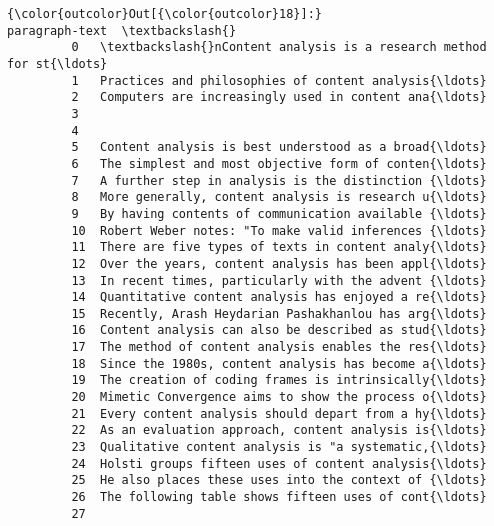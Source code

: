 \documentclass[11pt]{article}
\begin{document}
\begin{Verbatim}[commandchars=\\\{\}]
{\color{outcolor}Out[{\color{outcolor}18}]:}                                        paragraph-text  \textbackslash{}
         0   \textbackslash{}nContent analysis is a research method for st{\ldots}   
         1   Practices and philosophies of content analysis{\ldots}   
         2   Computers are increasingly used in content ana{\ldots}   
         3                                                       
         4                                                       
         5   Content analysis is best understood as a broad{\ldots}   
         6   The simplest and most objective form of conten{\ldots}   
         7   A further step in analysis is the distinction {\ldots}   
         8   More generally, content analysis is research u{\ldots}   
         9   By having contents of communication available {\ldots}   
         10  Robert Weber notes: "To make valid inferences {\ldots}   
         11  There are five types of texts in content analy{\ldots}   
         12  Over the years, content analysis has been appl{\ldots}   
         13  In recent times, particularly with the advent {\ldots}   
         14  Quantitative content analysis has enjoyed a re{\ldots}   
         15  Recently, Arash Heydarian Pashakhanlou has arg{\ldots}   
         16  Content analysis can also be described as stud{\ldots}   
         17  The method of content analysis enables the res{\ldots}   
         18  Since the 1980s, content analysis has become a{\ldots}   
         19  The creation of coding frames is intrinsically{\ldots}   
         20  Mimetic Convergence aims to show the process o{\ldots}   
         21  Every content analysis should depart from a hy{\ldots}   
         22  As an evaluation approach, content analysis is{\ldots}   
         23  Qualitative content analysis is "a systematic,{\ldots}   
         24  Holsti groups fifteen uses of content analysis{\ldots}   
         25  He also places these uses into the context of {\ldots}   
         26  The following table shows fifteen uses of cont{\ldots}   
         27                                                      
         

\end{Verbatim}
\end{document}
